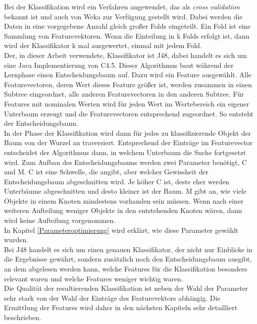 Bei der Klassifikation wird ein Verfahren angewendet, das als \textit{cross validation} bekannt ist und auch von Weka zur Verfügung gestellt wird. Dabei werden die Daten in eine vorgegebene Anzahl gleich großer Folds eingeteilt. Ein Fold ist eine Sammlung von Featurevektoren. Wenn die Einteilung in k Folds erfolgt ist, dann wird der Klassifikator k mal ausgewertet, einmal mit jedem Fold.\\
Der, in dieser Arbeit verwendete, Klassifikator ist J48, dabei handelt es sich um eine Java Implementierung von C4.5.  Dieser Algorithmus baut während der Lernphase einen Entscheidungsbaum auf. Dazu wird ein Feature ausgewählt. Alle Featurevectoren, deren Wert dieses Feature größer ist, werden zusammen in einen Subtree eingeordnet, alle anderen Featurevectoren in den anderen Subtree. Für Features mit nominalen Werten wird für jeden Wert im Wertebereich ein eigener Unterbaum erzeugt und die Featurevectoren entsprechend zugeordnet. So entsteht der Entscheidungsbaum.\\
In der Phase der Klassifikation wird dann für jedes zu klassifizierende Objekt der Baum von der Wurzel an traversiert. Entsprechend der Einträge im Featurevector entscheidet der Algorithmus dann, in welchem Unterbaum die Suche fortgesetzt wird. Zum Aufbau des Entscheidungsbaums werden zwei Parameter benötigt, C und M. C ist eine Schwelle, die angibt, aber welcher Gewissheit der Entscheidungsbaum abgeschnitten wird. Je höher C ist, deste eher werden Unterbäume abgeschnitten und desto kleiner ist der Baum. M gibt an, wie viele Objekte in einem Knoten mindestens vorhanden sein müssen. Wenn nach einer weiteren Aufteilung weniger Objekte in den entstehenden Knoten wären, dann wird keine Aufteilung vorgenommen.\cite[chapter 6.1]{Witten2011}\\
In Kapitel \ref{Parameteroptimierung} wird erklärt, wie diese Parameter gewählt wurden.\\
Bei J48 handelt es sich um einen genauen Klassifikator, der nicht nur Einblicke in die Ergebnisse gewährt, sondern zusätzlich noch den Entscheidungsbaum ausgibt, an dem abgelesen werden kann, welche Features für die Klassifikation besonders relevant waren und welche Features weniger wichtig waren.\\
Die Qualität der resultierenden Klassifikation ist neben der Wahl der Parameter sehr stark von der Wahl der Einträge des Featurevektors abhängig. Die Ermittlung der Features wird daher in den nächsten Kapiteln sehr detailliert beschrieben.\\
